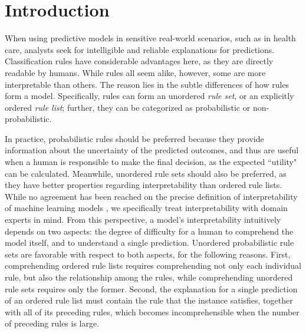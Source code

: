 \section{Introduction} \label{sec:intro}
When using predictive models in sensitive real-world scenarios, such as in health care, analysts seek for intelligible and reliable explanations for predictions. Classification rules have considerable advantages here, as they are directly readable by humans. While rules all seem alike, however, some are more interpretable than others. The reason lies in the subtle differences of how rules form a model. Specifically, rules can form an unordered \emph{rule set}, or an explicitly ordered \emph{rule list}; further, they can be categorized as probabilistic or non-probabilistic. 

In practice, probabilistic rules should be preferred because they provide information about the uncertainty of the predicted outcomes, and thus are useful when a human is responsible to make the final decision, as the expected ``utility" can be calculated. 
 Meanwhile, unordered rule sets should also be preferred, as they have better properties regarding interpretability than ordered rule lists. 
 While no agreement has been reached on the precise definition of interpretability of machine learning models 
 \citep{murdoch2019interpretable,molnar2020interpretable}, we specifically treat interpretability with domain experts in mind. From this perspective, a model's interpretability intuitively depends on two aspects: the degree of difficulty for a human to comprehend the model itself, and to understand a single prediction. Unordered probabilistic rule sets are favorable with respect to both aspects, for the following reasons. First, comprehending ordered rule lists requires comprehending not only each individual rule, but also the relationship among the rules, while comprehending unordered rule sets requires only the former. Second, the explanation for a single prediction of an ordered rule list must contain the rule that the instance satisfies, together with all of its preceding rules, which becomes incomprehensible when the number of preceding rules is large. 

